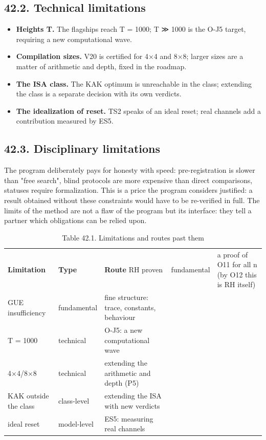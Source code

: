 \documentclass[11pt,a4paper]{article}
\begin{document}
\subsection{42.2. Technical limitations}

\begin{itemize}
  \item \textbf{Heights T.} The flagships reach T = 1000; T ≫ 1000 is the O-J5 target, requiring a new computational wave.
  \item \textbf{Compilation sizes.} V20 is certified for 4×4 and 8×8; larger sizes are a matter of arithmetic and depth, fixed in the roadmap.
  \item \textbf{The ISA class.} The KAK optimum is unreachable in the class; extending the class is a separate decision with its own verdicts.
  \item \textbf{The idealization of reset.} TS2 speaks of an ideal reset; real channels add a contribution measured by ES5.
\end{itemize}

\subsection{42.3. Disciplinary limitations}

The program deliberately pays for honesty with speed: pre-registration is slower than "free search", blind protocols are more expensive than direct comparisons, statuses require formalization. This is a price the program considers justified: a result obtained without these constraints would have to be re-verified in full. The limits of the method are not a flaw of the program but its interface: they tell a partner which obligations can be relied upon.

\begin{table}[htbp]\centering\small
\caption{Table 42.1. Limitations and routes past them}
\begin{tabular}{p{} p{} p{}}
\toprule
\textbf{Limitation} & \textbf{Type} & \textbf{Route}
\midrule
RH proven & fundamental & a proof of O11 for all n (by O12 this is RH itself) \\
GUE insufficiency & fundamental & fine structure: trace, constants, behaviour \\
T = 1000 & technical & O-J5: a new computational wave \\
4×4/8×8 & technical & extending the arithmetic and depth (P5) \\
KAK outside the class & class-level & extending the ISA with new verdicts \\
ideal reset & model-level & ES5: measuring real channels \\
\bottomrule
\end{tabular}
\end{table}
\end{document}
